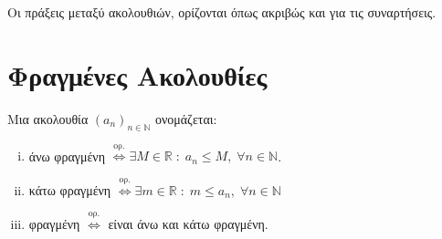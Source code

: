 \documentclass[a4paper,table]{report}
\begin{document}
\begin{mybox1}
  \begin{dfn}
    Οι πράξεις μεταξύ ακολουθιών, ορίζονται όπως ακριβώς και για τις συναρτήσεις.
  \end{dfn}
\end{mybox1}


\section{Φραγμένες Ακολουθίες}

\begin{mybox1}
  \begin{dfn}
    Μια ακολουθία $ (a_{n})_{n \in \mathbb{N}} $ ονομάζεται:
    \begin{enumerate}[i)]
      \item \textcolor{Col1}{άνω φραγμένη} 
        $ \overset{\text{ορ.}}{\Leftrightarrow} \exists M \in 
        \mathbb{R} \; : \; a_{n} \leq M, \; \forall n \in \mathbb{N}$.
      \item \textcolor{Col1}{κάτω φραγμένη} 
        $ \overset{\text{ορ.}}{\Leftrightarrow} \exists m \in 
        \mathbb{R} \; : \; m \leq a_{n}, \; \forall n \in \mathbb{N}  $
      \item \textcolor{Col1}{φραγμένη} 
        $ \overset{\text{ορ.}}{\Leftrightarrow} $ είναι άνω και κάτω φραγμένη.
    \end{enumerate}
  \end{dfn}
\end{mybox1}
\end{document}
